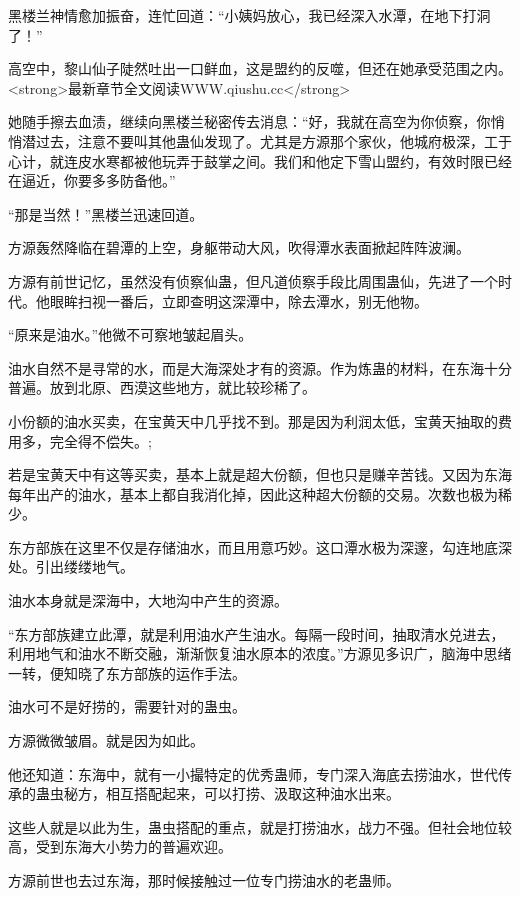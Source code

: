 
\begin{this_body}

黑楼兰神情愈加振奋，连忙回道：“小姨妈放心，我已经深入水潭，在地下打洞了！”

高空中，黎山仙子陡然吐出一口鲜血，这是盟约的反噬，但还在她承受范围之内。<strong>最新章节全文阅读WWW.qiushu.cc</strong>

她随手擦去血渍，继续向黑楼兰秘密传去消息：“好，我就在高空为你侦察，你悄悄潜过去，注意不要叫其他蛊仙发现了。尤其是方源那个家伙，他城府极深，工于心计，就连皮水寒都被他玩弄于鼓掌之间。我们和他定下雪山盟约，有效时限已经在逼近，你要多多防备他。”

“那是当然！”黑楼兰迅速回道。

方源轰然降临在碧潭的上空，身躯带动大风，吹得潭水表面掀起阵阵波澜。

方源有前世记忆，虽然没有侦察仙蛊，但凡道侦察手段比周围蛊仙，先进了一个时代。他眼眸扫视一番后，立即查明这深潭中，除去潭水，别无他物。

“原来是油水。”他微不可察地皱起眉头。

油水自然不是寻常的水，而是大海深处才有的资源。作为炼蛊的材料，在东海十分普遍。放到北原、西漠这些地方，就比较珍稀了。

小份额的油水买卖，在宝黄天中几乎找不到。那是因为利润太低，宝黄天抽取的费用多，完全得不偿失。;

若是宝黄天中有这等买卖，基本上就是超大份额，但也只是赚辛苦钱。又因为东海每年出产的油水，基本上都自我消化掉，因此这种超大份额的交易。次数也极为稀少。

东方部族在这里不仅是存储油水，而且用意巧妙。这口潭水极为深邃，勾连地底深处。引出缕缕地气。

油水本身就是深海中，大地沟中产生的资源。

“东方部族建立此潭，就是利用油水产生油水。每隔一段时间，抽取清水兑进去，利用地气和油水不断交融，渐渐恢复油水原本的浓度。”方源见多识广，脑海中思绪一转，便知晓了东方部族的运作手法。

油水可不是好捞的，需要针对的蛊虫。

方源微微皱眉。就是因为如此。

他还知道：东海中，就有一小撮特定的优秀蛊师，专门深入海底去捞油水，世代传承的蛊虫秘方，相互搭配起来，可以打捞、汲取这种油水出来。

这些人就是以此为生，蛊虫搭配的重点，就是打捞油水，战力不强。但社会地位较高，受到东海大小势力的普遍欢迎。

方源前世也去过东海，那时候接触过一位专门捞油水的老蛊师。


\end{this_body}
